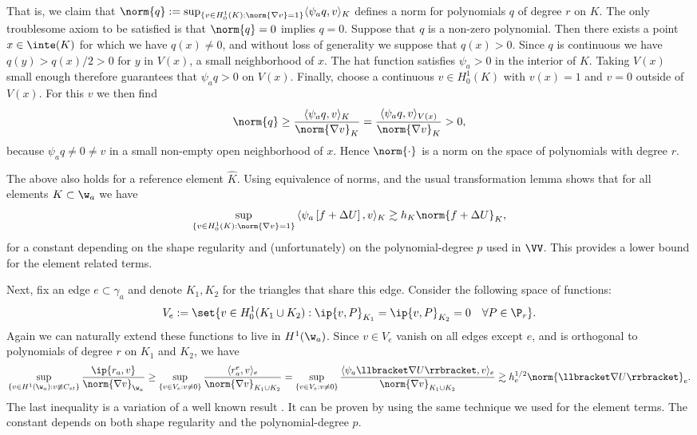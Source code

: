   That is, we claim that $\norm{q} := \sup_{\{v \in H_0^1(K) : \norm{\nabla v}=1\}} \langle \psi_a q, v\rangle_K$
  defines a norm for polynomials $q$ of degree $r$ on $K$. The only troublesome axiom to be satisfied
  is that $\norm{q} = 0$  implies $q=0$. Suppose that $q$ is a non-zero polynomial.
  Then there exists a point $x \in \inte(K)$ for which we have $q(x) \ne 0$, and without loss of generality we suppose that $q(x) > 0$.
  Since $q$ is continuous we have $q(y) > q(x) / 2 > 0$ for $y$ in $V(x)$, a small neighborhood of $x$.
  The hat function satisfies $\psi_a > 0$ in the interior of $K$. Taking $V(x)$ small enough therefore guarantees that $\psi_a q>0$ on $V(x)$.
  Finally, choose a continuous $v \in H_0^1(K)$  with $v(x) = 1$ and $v = 0$ outside of $V(x)$. For this $v$ we then find
  \[
    \norm{q} \geq { \langle  \psi_a q, v\rangle_K \over \norm{\nabla v}_K}  = {\langle \psi_a q, v\rangle_{V(x)} \over \norm{\nabla v}_K} > 0,
  \]
  because $\psi_a q \ne 0 \ne v$ in a small non-empty open neighborhood of $x$. Hence $\norm{\cdot}$ is a norm on the space of polynomials with degree $r$.
  
  The above also holds for a reference element $\hat K$. Using equivalence of norms, and the usual transformation lemma
  shows that for all elements $K \subset \w_a$ we have
  \[
    \sup_{\{v \in H_0^1(K) :  \norm{\nabla v}=1\}} { \langle\psi_a\left[ f + \Delta U\right],v\rangle_K } \gtrsim h_K \norm{ f + \Delta U }_K,
  \]
  for a constant depending on the shape regularity and (unfortunately) on the polynomial-degree $p$ used in $\VV$.  This
  provides a lower bound for the element related terms.
  
  
  Next, fix an edge $e \subset \gamma_a$ and denote $K_1, K_2$ for the triangles that share this edge. Consider the following space of functions:
  \[
  V_e := \set{v \in H_0^1(K_1 \cup K_2) : \ip{v,P}_{K_1}= \ip{v,P}_{K_2} = 0\quad \forall P \in \P_r}.\]
  Again we can naturally extend these functions to live in $H^1(\w_a)$. Since $v \in V_e$ vanish on all edges except $e$, and
  is orthogonal to polynomials of degree $r$ on $K_1$ and $K_2$, we have
  \[
    \sup_{\{v \in H^1(\w_a) : v \not \equiv C_{st}\}} { \ip{r_a, v} \over \norm{\nabla v}_{\w_a}} 
    \geq \sup_{\{v \in V_e: v \ne 0\}} { \langle r^e_a, v \rangle_e \over \norm{\nabla v}_{K_1 \cup K_2}}
    = \sup_{\{v \in V_e: v \ne 0\}} { \langle \psi_a \llbracket \nabla U \rrbracket, v \rangle_e \over \norm{\nabla v}_{K_1 \cup K_2}}
          \gtrsim h_e^{1/2} \norm{\llbracket \nabla U \rrbracket}_e.
  \]
  The last inequality is a variation of a well known result \cite[Ex~9.x.7]{brenner}. It can be proven by using the same
  technique we used for the element terms. The constant depends on both shape regularity and the polynomial-degree $p$.

